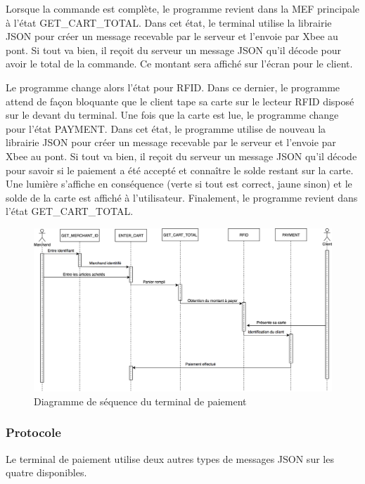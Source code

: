 		Lorsque la commande est complète, le programme revient dans la MEF principale à l’état GET\_CART\_TOTAL. Dans cet état, le terminal utilise la librairie JSON pour créer un message recevable par le serveur et l’envoie par Xbee au pont. Si tout va bien, il reçoit du serveur un message JSON qu’il décode pour avoir le total de la commande. Ce montant sera affiché sur l’écran pour le client.

		Le programme change alors l’état pour RFID. Dans ce dernier, le programme attend de façon bloquante que le client tape sa carte sur le lecteur RFID disposé sur le devant du terminal. Une fois que la carte est lue, le programme change pour l’état PAYMENT. Dans cet état, le programme utilise de nouveau la librairie JSON pour créer un message recevable par le serveur et l’envoie par Xbee au pont.  Si tout va bien, il reçoit du serveur un message JSON qu’il décode pour savoir si le paiement a été accepté et connaître le solde restant sur la carte. Une lumière s’affiche en conséquence (verte si tout est correct, jaune sinon) et le solde de la carte est affiché à l’utilisateur. Finalement, le programme revient dans l’état GET\_CART\_TOTAL.

		\begin{landscape}
			\begin{figure}[p]
				\includegraphics[width=1.5\textheight]{Pictures/UML/PaiementSequence}
				\caption{Diagramme de séquence du terminal de paiement}
				\label{fig.paieseq}
			\end{figure}			
		\end{landscape}


		\subsubsection{Protocole}
		Le terminal de paiement utilise deux autres types de messages JSON sur les quatre disponibles.
		
